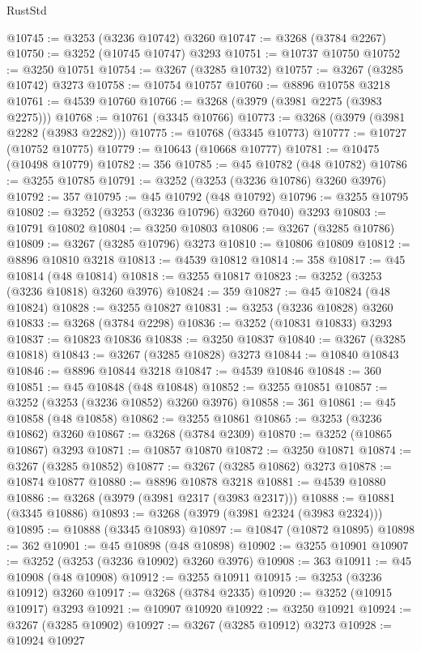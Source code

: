 \begin{lexlean}{RustStd}
\begin{coremodule}
{\begin{coremodule}
{{{{{{{{{{{{{{{{{{{{{{{{{{{{{{{{{{{{{{{@10745 := @3253 (@3236 @10742) @3260
@10747 := @3268 (@3784 @2267)
@10750 := @3252 (@10745 @10747) @3293
@10751 := @10737 @10750
@10752 := @3250 @10751
@10754 := @3267 (@3285 @10732)
@10757 := @3267 (@3285 @10742) @3273
@10758 := @10754 @10757
@10760 := @8896 @10758 @3218
@10761 := @4539 @10760
@10766 := @3268 (@3979 (@3981 @2275 (@3983 @2275)))
@10768 := @10761 (@3345 @10766)
@10773 := @3268 (@3979 (@3981 @2282 (@3983 @2282)))
@10775 := @10768 (@3345 @10773)
@10777 := @10727 (@10752 @10775)
@10779 := @10643 (@10668 @10777)
@10781 := @10475 (@10498 @10779)
@10782 := 356
@10785 := @45 @10782 (@48 @10782)
@10786 := @3255 @10785
@10791 := @3252 (@3253 (@3236 @10786) @3260 @3976)
@10792 := 357
@10795 := @45 @10792 (@48 @10792)
@10796 := @3255 @10795
@10802 := @3252 (@3253 (@3236 @10796) @3260 @7040) @3293
@10803 := @10791 @10802
@10804 := @3250 @10803
@10806 := @3267 (@3285 @10786)
@10809 := @3267 (@3285 @10796) @3273
@10810 := @10806 @10809
@10812 := @8896 @10810 @3218
@10813 := @4539 @10812
@10814 := 358
@10817 := @45 @10814 (@48 @10814)
@10818 := @3255 @10817
@10823 := @3252 (@3253 (@3236 @10818) @3260 @3976)
@10824 := 359
@10827 := @45 @10824 (@48 @10824)
@10828 := @3255 @10827
@10831 := @3253 (@3236 @10828) @3260
@10833 := @3268 (@3784 @2298)
@10836 := @3252 (@10831 @10833) @3293
@10837 := @10823 @10836
@10838 := @3250 @10837
@10840 := @3267 (@3285 @10818)
@10843 := @3267 (@3285 @10828) @3273
@10844 := @10840 @10843
@10846 := @8896 @10844 @3218
@10847 := @4539 @10846
@10848 := 360
@10851 := @45 @10848 (@48 @10848)
@10852 := @3255 @10851
@10857 := @3252 (@3253 (@3236 @10852) @3260 @3976)
@10858 := 361
@10861 := @45 @10858 (@48 @10858)
@10862 := @3255 @10861
@10865 := @3253 (@3236 @10862) @3260
@10867 := @3268 (@3784 @2309)
@10870 := @3252 (@10865 @10867) @3293
@10871 := @10857 @10870
@10872 := @3250 @10871
@10874 := @3267 (@3285 @10852)
@10877 := @3267 (@3285 @10862) @3273
@10878 := @10874 @10877
@10880 := @8896 @10878 @3218
@10881 := @4539 @10880
@10886 := @3268 (@3979 (@3981 @2317 (@3983 @2317)))
@10888 := @10881 (@3345 @10886)
@10893 := @3268 (@3979 (@3981 @2324 (@3983 @2324)))
@10895 := @10888 (@3345 @10893)
@10897 := @10847 (@10872 @10895)
@10898 := 362
@10901 := @45 @10898 (@48 @10898)
@10902 := @3255 @10901
@10907 := @3252 (@3253 (@3236 @10902) @3260 @3976)
@10908 := 363
@10911 := @45 @10908 (@48 @10908)
@10912 := @3255 @10911
@10915 := @3253 (@3236 @10912) @3260
@10917 := @3268 (@3784 @2335)
@10920 := @3252 (@10915 @10917) @3293
@10921 := @10907 @10920
@10922 := @3250 @10921
@10924 := @3267 (@3285 @10902)
@10927 := @3267 (@3285 @10912) @3273
@10928 := @10924 @10927
}}}}}}}}}}}}}}}}}}}}}}}}}}}}}}}}}}}}}}}
\end{coremodule}}
\end{coremodule}
\end{lexlean}

